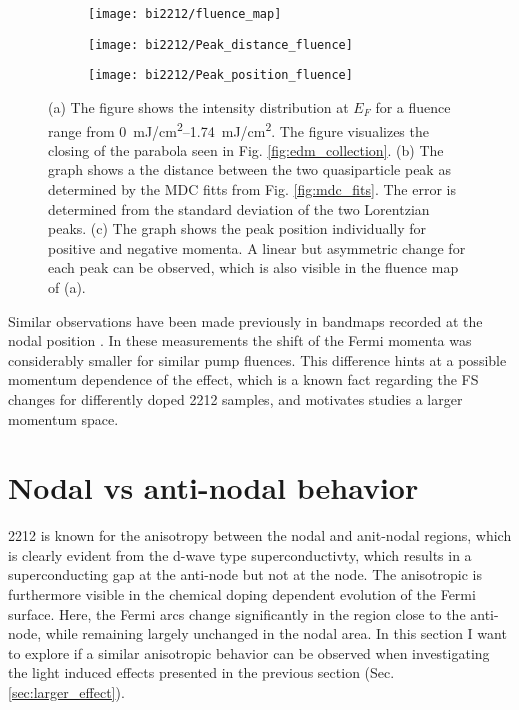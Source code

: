 \begin{figure}[t]
	\centering
	\begin{subfigure}[b]{0.25\textwidth}
		\texttt{[image: bi2212/fluence\_map]}
		\caption{}
	\end{subfigure}
	\begin{subfigure}[b]{0.35\textwidth}
		\texttt{[image: bi2212/Peak\_distance\_fluence]}
		\caption{}
	\end{subfigure}
	\begin{subfigure}[b]{0.35\textwidth}
		\texttt{[image: bi2212/Peak\_position\_fluence]}
		\caption{}
	\end{subfigure}
	\caption{(a) The figure shows the intensity distribution at $E_F$ for a fluence range from \qtyrange{0}{1.74}{\milli\joule/\centi\meter\squared}. The figure visualizes the closing of the parabola seen in Fig. \ref{fig:edm_collection}. (b) The graph shows a the distance between the two quasiparticle peak as determined by the MDC fitts from Fig. \ref{fig:mdc_fits}. The error is determined from the standard deviation of the two Lorentzian peaks. (c) The graph shows the peak position individually for positive and negative momenta. A linear but asymmetric change for each peak can be observed, which is also visible in the fluence map of (a).}
	\label{fig:fluence_map}
\end{figure}

Similar observations have been made previously in bandmaps recorded at the nodal position \cite{rameau_photoinduced_2014}.
In these measurements the shift of the Fermi momenta was considerably smaller for similar pump fluences.
This difference hints at a possible momentum dependence of the effect, which is a known fact regarding the FS changes for differently doped 2212 samples, and motivates studies a larger momentum space.

\section{Nodal vs anti-nodal behavior}
\label{sec:angle}

2212 is known for the anisotropy between the nodal and anit-nodal regions, which is clearly evident from the d-wave type superconductivty, which results in a superconducting gap at the anti-node but not at the node.
The anisotropic is furthermore visible in the chemical doping dependent evolution of the Fermi surface.
Here, the Fermi arcs change significantly in the region close to the anti-node, while remaining largely unchanged in the nodal area.
In this section I want to explore if a similar anisotropic behavior can be observed when investigating the light induced effects presented in the previous section (Sec. \ref{sec:larger_effect}).


